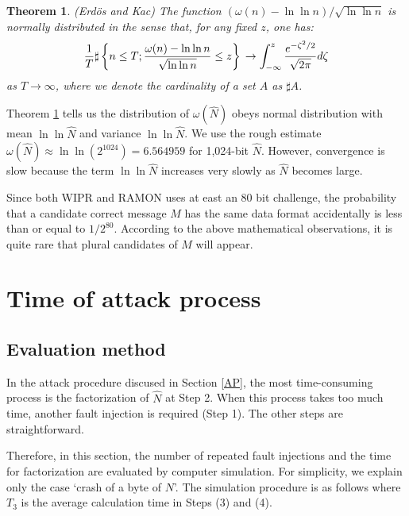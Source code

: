 \documentclass{article}
\newtheorem{thm}{Theorem}
\begin{document}
\begin{thm}(Erd\"os and Kac\cite{ErdosKac}) \label{EK}
The function $(\omega(n)-\ln\ln n)/\sqrt{\ln\ln n}$ is normally distributed in the 
sense that, for any fixed $z$, one has:
$$ 
\frac{1}{T}\sharp
\left\{
n\leq T;\frac{\omega(n)-\ln\ln n}{\sqrt{\ln\ln n}}\leq z\right\} \\
\to 
\int_{-\infty}^z\frac{e^{-\zeta^2/2}}{\sqrt{2\pi}}d\zeta 
$$
as $T\to\infty$, 
where we denote the cardinality of a set $A$ as $\sharp A$.
\end{thm}

Theorem \ref{EK} tells us the distribution of $\omega(\hat{N})$ obeys 
normal distribution with mean $\ln\ln \hat{N}$ and variance $\ln\ln \hat{N}$.
We use the rough estimate $\omega(\hat{N})\approx \ln\ln(2^{1024})=6.564959$ for 1,024-bit $\hat{N}$. 
However, convergence is slow because 
the term $\ln\ln \hat{N}$ increases very slowly as $\hat{N}$ becomes large.

Since both WIPR and RAMON uses at east an 80 bit challenge, 
the probability that a candidate correct message $M$ has the same data format 
accidentally is less than or equal to $1/2^{80}$.
According to the above mathematical observations, 
it is quite rare that plural candidates of $M$ will appear.



\section{Time of attack process}\label{SIM}
\subsection{Evaluation method}
In the attack procedure discused in Section \ref{AP}, 
the most time-consuming process is the 
factorization of $\hat{N}$ at Step 2. 
When this process takes too much time, another fault injection 
is required (Step 1). The other steps are straightforward. 


 Therefore, in this section, the number of repeated fault injections and the time for factorization are 
evaluated by computer simulation. For simplicity, we explain only 
the case `crash of a byte of $N$'. 
The simulation procedure is as follows where $T_3$ is the average calculation time in Steps (3) and (4).
\end{document}
